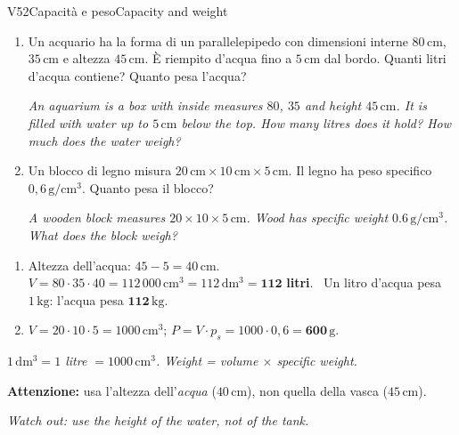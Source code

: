 \documentclass[11pt,a4paper]{article}
\newcommand{\en}[1]{\par{\small\itshape\color{engray}#1\par}}
\newcommand{\unit}[1]{\,\mathrm{#1}}
\newcommand{\cm}{\unit{cm}}
\newcommand{\cmc}{\unit{cm^3}}
\newcommand{\errore}[2]{\begin{attenzione}\textbf{\color{fgA}Attenzione:} #1\par
  {\itshape\color{engray}Watch out: #2}\end{attenzione}}
\begin{document}
\begin{esercizio}{V5}{2}{Capacità e peso}{Capacity and weight}
\begin{enumerate}
\item Un acquario ha la forma di un parallelepipedo con dimensioni interne $80\cm$, $35\cm$ e altezza $45\cm$. È riempito d'acqua fino a $5\cm$ dal bordo. Quanti litri d'acqua contiene? Quanto pesa l'acqua?
\en{An aquarium is a box with inside measures $80$, $35$ and height $45\cm$. It is filled with water up to $5\cm$ below the top. How many litres does it hold? How much does the water weigh?}
\item Un blocco di legno misura $20\cm\times10\cm\times5\cm$. Il legno ha peso specifico $0,6\unit{g/cm^3}$. Quanto pesa il blocco?
\en{A wooden block measures $20 \times 10 \times 5\cm$. Wood has specific weight $0.6\unit{g/cm^3}$. What does the block weigh?}
\end{enumerate}
\begin{center}
\end{center}
\end{esercizio}
\begin{solbox}
\begin{enumerate}
\item Altezza dell'acqua: $45-5=40\cm$. \ $V=80\cdot35\cdot40=112\,000\cmc=112\unit{dm^3}=\mathbf{112}$ \textbf{litri}. \ Un litro d'acqua pesa $1\unit{kg}$: l'acqua pesa $\mathbf{112\unit{kg}}$.
\item $V=20\cdot10\cdot5=1000\cmc$; \quad $P=V\cdot p_s=1000\cdot0,6=\mathbf{600\unit{g}}$.
\end{enumerate}
\en{$1\unit{dm^3} = 1$ litre $= 1000\cmc$. Weight = volume $\times$ specific weight.}
\errore{usa l'altezza dell'\emph{acqua} ($40\cm$), non quella della vasca ($45\cm$).}{use the height of the water, not of the tank.}
\end{solbox}
\end{document}
